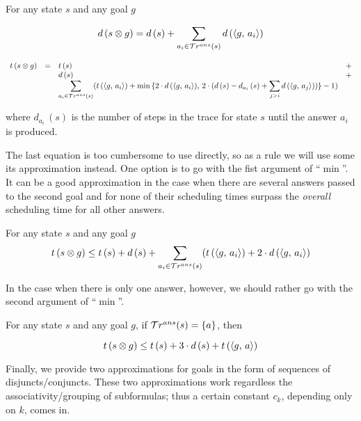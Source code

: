 \begin{lemma}
For any state $s$ and any goal $g$

\[
d\,(s \otimes g) = d\,(s) + \displaystyle\sum\limits_{a_i \in \mathcal{T}r^{ans}(s)} d\,(\langle g ,\, a_i \rangle)
\]

\[
\begin{array}{rclc}
  t\,(s \otimes g) &=& t\,(s) & + \\
                   & & d\,(s) & + \\
  & & \displaystyle\sum\limits_{a_i \in \mathcal{T}r^{ans}(s)} (t\,(\langle g ,\, a_i \rangle) + \min\,\{2\cdot d\,(\langle g ,\, a_i \rangle),\,2\cdot (d\,(s) - d_{a_i}\,(s) + \displaystyle\sum\limits_{j > i} d\,(\langle g ,\, a_j \rangle))\} - 1)
\end{array}
\]

where $d_{a_i}\,(s)$ is the number of steps in the trace for state $s$ until the answer $a_i$ is produced.
\end{lemma}

The last equation is too cumbersome to use directly, so as a rule we will use some its approximation instead. One option is to go with the fist argument of ``$\min$''. It can be a good approximation
in the case when there are several answers passed to the second goal and for none of their scheduling times surpass the \emph{overall} scheduling time for all other answers.

\begin{corollary}
For any state $s$ and any goal $g$
\[ t\,(s \otimes g) \le t\,(s) + d\,(s) +  \displaystyle\sum\limits_{a_i \in \mathcal{T}r^{ans}(s)} (t\,(\langle g ,\, a_i \rangle) + 2\cdot d\,(\langle g ,\, a_i \rangle) \]
\end{corollary}

In the case when there is only one answer, however, we should rather go with the second argument of ``$\min$''.

\begin{corollary}
  For any state $s$ and any goal $g$, if $\mathcal{T}r^{ans}(s) = \{a\}$, then
  
\[ t\,(s \otimes g) \le t\,(s) + 3\cdot d\,(s) + t\,(\langle g ,\, a \rangle) \]
\end{corollary}

Finally, we provide two approximations for goals in the form of sequences of disjuncts/conjuncts. These two approximations work regardless the associativity/grouping of subformulas; thus a
certain constant $c_k$, depending only on $k$, comes in.

